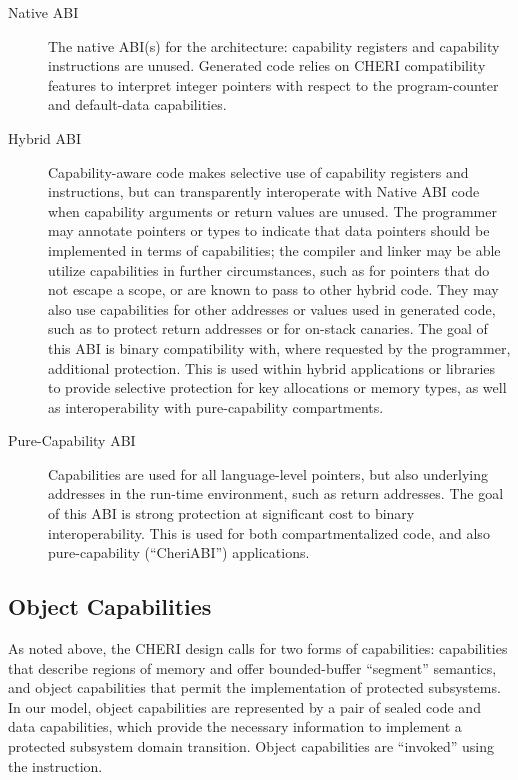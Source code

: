 \begin{description}
\item[Native ABI] The native ABI(s) for the architecture: capability registers
  and capability instructions are unused.
  Generated code relies on CHERI compatibility features to interpret integer
  pointers with respect to the program-counter and default-data capabilities.

\item[Hybrid ABI] Capability-aware code makes selective use of capability
  registers and instructions, but can transparently interoperate with Native ABI
  code when capability arguments or return values are unused.
  The programmer may annotate pointers or types to indicate that data pointers
  should be implemented in terms of capabilities; the compiler and linker may
  be able utilize capabilities in further circumstances, such as for pointers
  that do not escape a scope, or are known to pass to other hybrid code.
  They may also use capabilities for other addresses or values used in
  generated code, such as to protect return addresses or for on-stack
  canaries.
  The goal of this ABI is binary compatibility with, where requested by the
  programmer, additional protection.
  This is used within hybrid applications or libraries to provide selective
  protection for key allocations or memory types, as well as interoperability
  with pure-capability compartments.

\item[Pure-Capability ABI] Capabilities are used for all language-level
  pointers, but also underlying addresses in the run-time environment, such as
  return addresses.
  The goal of this ABI is strong protection at significant cost to binary
  interoperability.
  This is used for both compartmentalized code, and also pure-capability
  (``CheriABI'') applications.
\end{description}

\subsection{Object Capabilities}


As noted above, the CHERI design calls for two forms of capabilities:
capabilities that describe regions of memory and offer bounded-buffer
``segment'' semantics, and object capabilities that permit the
implementation of protected subsystems.
In our model, object capabilities are represented by a pair of sealed
code and data capabilities, which provide the necessary information to implement
a protected subsystem domain transition.
Object capabilities are ``invoked'' using the  instruction.

